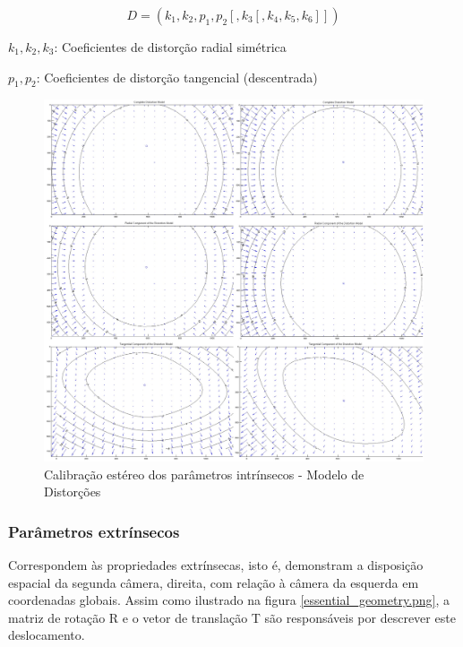 \begin{equation}
  D = (k_1,k_2,p_1,p_2[,k_3[,k_4,k_5,k_6]])
\end{equation}

\begin{center}
  $k_1,k_2,k_3$: Coeficientes de distorção radial simétrica
  
  $p_1,p_2$: Coeficientes de distorção tangencial (descentrada)
\end{center}

\begin{figure}[H]
 	\centering
 	\includegraphics[scale=0.20]{./Resources/distortion/lenses_distortion.jpg}
 	\caption{Calibração estéreo dos parâmetros intrínsecos - Modelo de Distorções}
 	\label{lenses_distortion}
\end{figure}


\subsubsection{Parâmetros extrínsecos}
Correspondem às propriedades extrínsecas, isto é, demonstram a disposição espacial da segunda câmera, direita, com relação à câmera da esquerda em coordenadas globais. Assim como ilustrado na figura \ref{essential_geometry.png}, a matriz de rotação R e o vetor de translação T são responsáveis por descrever este deslocamento.

